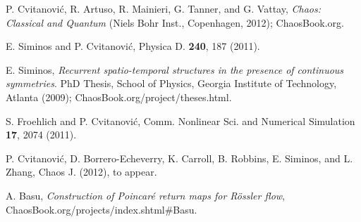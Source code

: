 \documentclass[10pt,letter]{article}
\begin{document}
\begin{thebibliography}{9}

 P. Cvitanovi\'c, R. Artuso, R. Mainieri, G. Tanner, and G. Vattay,
     \emph{Chaos: Classical and Quantum} (Niels Bohr Inst., Copenhagen, 2012);
    ChaosBook.org.

 E. Siminos and P. Cvitanovi\'c, Physica D. {\bf 240}, 187 (2011).

 E. Siminos,
    \emph{Recurrent spatio-temporal structures in the presence of
    continuous symmetries}. PhD Thesis, School of Physics, Georgia
    Institute of Technology, Atlanta (2009);
    ChaosBook.org/project/theses.html.

 S. Froehlich and P. Cvitanovi\'c, Comm. Nonlinear
            Sci. and Numerical Simulation {\bf 17}, 2074 (2011).

 P. Cvitanovi\'c, D. Borrero-Echeverry, K. Carroll, B. Robbins,
        E. Siminos, and L. Zhang, Chaos J. (2012), to appear.

 A. Basu, \emph{Construction of Poincar\'e return maps for R\"ossler flow},
    ChaosBook.org/projects/index.shtml\#Basu.


\end{thebibliography}
\end{document}
